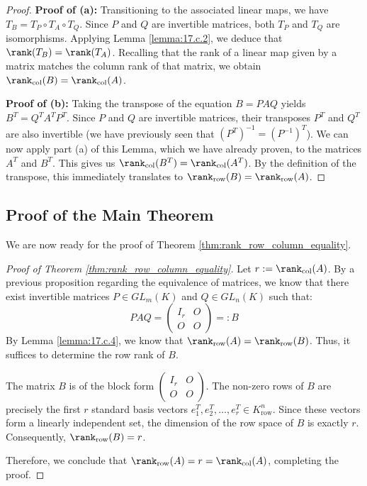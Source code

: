 \begin{proof}
\textbf{Proof of (a):} Transitioning to the associated linear maps, we have $T_B = T_P \circ T_A \circ T_Q$. Since $P$ and $Q$ are invertible matrices, both $T_P$ and $T_Q$ are isomorphisms. Applying Lemma \ref{lemma:17.c.2}, we deduce that $\rank(T_B) = \rank(T_A)$. Recalling that the rank of a linear map given by a matrix matches the column rank of that matrix, we obtain $\rank_{\text{col}}(B) = \rank_{\text{col}}(A)$.

\textbf{Proof of (b):} Taking the transpose of the equation $B = PAQ$ yields $B^T = Q^T A^T P^T$. Since $P$ and $Q$ are invertible matrices, their transposes $P^T$ and $Q^T$ are also invertible (we have previously seen that $(P^T)^{-1} = (P^{-1})^T$). We can now apply part (a) of this Lemma, which we have already proven, to the matrices $A^T$ and $B^T$. This gives us $\rank_{\text{col}}(B^T) = \rank_{\text{col}}(A^T)$. By the definition of the transpose, this immediately translates to $\rank_{\text{row}}(B) = \rank_{\text{row}}(A)$.
\end{proof}

\subsection{Proof of the Main Theorem}

We are now ready for the proof of Theorem \ref{thm:rank_row_column_equality}.

\begin{proof}[Proof of Theorem \ref{thm:rank_row_column_equality}]
Let $r := \rank_{\text{col}}(A)$. By a previous proposition regarding the equivalence of matrices, we know that there exist invertible matrices $P \in GL_m(K)$ and $Q \in GL_n(K)$ such that:
\begin{equation*}
    P A Q = \begin{pmatrix} I_r & O \\ O & O \end{pmatrix} =: B
\end{equation*}
By Lemma \ref{lemma:17.c.4}, we know that $\rank_{\text{row}}(A) = \rank_{\text{row}}(B)$. Thus, it suffices to determine the row rank of $B$.

The matrix $B$ is of the block form $\left(\begin{smallmatrix} I_r & O \\ O & O \end{smallmatrix}\right)$. The non-zero rows of $B$ are precisely the first $r$ standard basis vectors $e_1^T, e_2^T, \dots, e_r^T \in K_{\text{row}}^n$. Since these vectors form a linearly independent set, the dimension of the row space of $B$ is exactly $r$. Consequently, $\rank_{\text{row}}(B) = r$.

Therefore, we conclude that $\rank_{\text{row}}(A) = r = \rank_{\text{col}}(A)$, completing the proof.
\end{proof}

